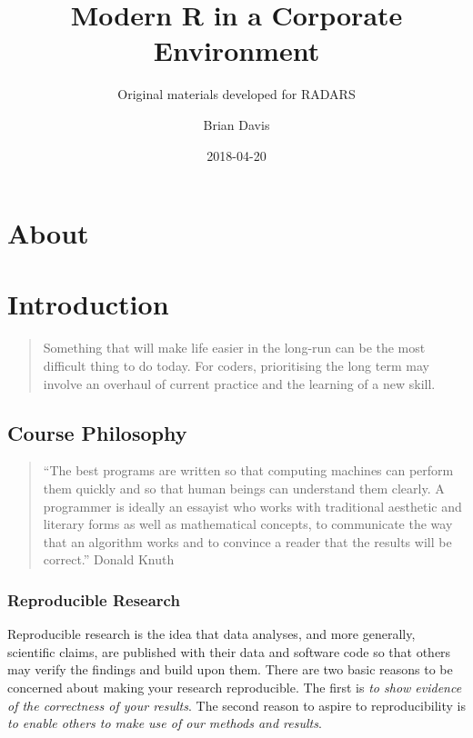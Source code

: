 \documentclass[]{book}
\title{Modern R in a Corporate Environment}
\subtitle{Original materials developed for RADARS}
\author{Brian Davis}
\date{2018-04-20}
\theoremstyle{definition}
\theoremstyle{definition}
\theoremstyle{definition}
\theoremstyle{remark}
\begin{document}
\maketitle

{
\setcounter{tocdepth}{1}
\tableofcontents
}
\chapter*{About}\label{about}

\chapter{Introduction}\label{introduction}

\begin{quote}
Something that will make life easier in the long-run can be the most
difficult thing to do today. For coders, prioritising the long term may
involve an overhaul of current practice and the learning of a new skill.
\end{quote}

\section{Course Philosophy}\label{course-philosophy}

\begin{quote}
``The best programs are written so that computing machines can perform
them quickly and so that human beings can understand them clearly. A
programmer is ideally an essayist who works with traditional aesthetic
and literary forms as well as mathematical concepts, to communicate the
way that an algorithm works and to convince a reader that the results
will be correct.'' Donald Knuth
\end{quote}

\subsection{Reproducible Research}\label{reproducible-research}

Reproducible research is the idea that data analyses, and more
generally, scientific claims, are published with their data and software
code so that others may verify the findings and build upon them. There
are two basic reasons to be concerned about making your research
reproducible. The first is \emph{to show evidence of the correctness of
your results}. The second reason to aspire to reproducibility is
\emph{to enable others to make use of our methods and results}.
\end{document}
